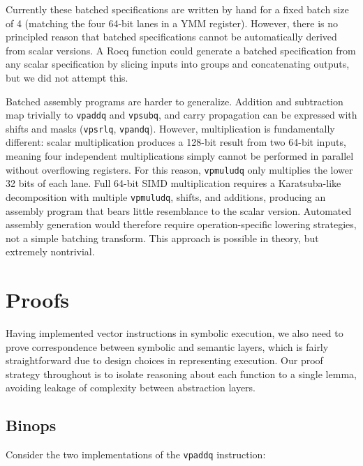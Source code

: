 Currently these batched specifications are written by hand for a fixed batch size of 4 (matching the four 64-bit lanes in a YMM register).
However, there is no principled reason that batched specifications cannot be automatically derived from scalar versions. A Rocq function could generate a batched specification from any scalar specification by slicing inputs into groups and concatenating outputs, but we did not attempt this.

Batched assembly programs are harder to generalize.
Addition and subtraction map trivially to \texttt{vpaddq} and \texttt{vpsubq}, and carry propagation can be expressed with shifts and masks (\texttt{vpsrlq}, \texttt{vpandq}).
However, multiplication is fundamentally different: scalar multiplication produces a 128-bit result from two 64-bit inputs, meaning four independent multiplications simply cannot be performed in parallel without overflowing registers.
For this reason, \texttt{vpmuludq} only multiplies the lower 32 bits of each lane.
Full 64-bit SIMD multiplication requires a Karatsuba-like decomposition with multiple \texttt{vpmuludq}, shifts, and additions, producing an assembly program that bears little resemblance to the scalar version.
Automated assembly generation would therefore require operation-specific lowering strategies, not a simple batching transform. This approach is possible in theory, but extremely nontrivial.


\chapter{Proofs}
\label{ch:Proofs}

Having implemented vector instructions in symbolic execution, we also need to prove correspondence between symbolic and semantic layers, which is fairly straightforward due to design choices in representing execution. Our proof strategy throughout is to isolate reasoning about each function to a single lemma, avoiding leakage of complexity between abstraction layers. 


\section{Binops}

Consider the two implementations of the \texttt{vpaddq} instruction:


